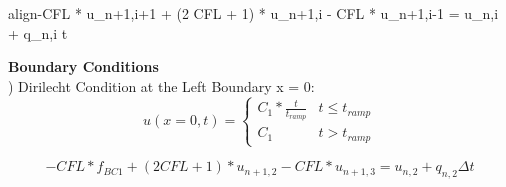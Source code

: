 \documentclass[10pt, letter, showtrims]{extarticle}
\newcommand{\boxedeq}[2]{\begin{empheq}[box={\fboxsep=6pt\fbox}]{align}\label{#1}#2\end{empheq}}
\begin{document}
%		
%		
%		
%		
%		
		
		\boxedeq{eq:implicit2}{-CFL * u_{n+1,i+1} + (2 CFL + 1) * u_{n+1,i} - CFL * u_{n+1,i-1} = u_{n,i} + q_{n,i} \Delta t}
		
		\noindent
		\textbf{Boundary Conditions} \\
		
		) Dirilecht Condition at the Left Boundary x = 0:	\\
		
		\begin{equation}
			u(x=0, t) = \begin{cases} 
          					C_{1} * \frac{t}{t_{ramp}} & t\leq t_{ramp} \\
          					C_{1}                      & t > t_{ramp}
       					\end{cases}
    		\end{equation}
    		
    		\begin{equation}
			-CFL * f_{BC1} + (2CFL + 1) * u_{n+1,2} - CFL * u_{n+1,3} = u_{n,2} + q_{n,2}\Delta t
		\end{equation} 
		
\end{document}
